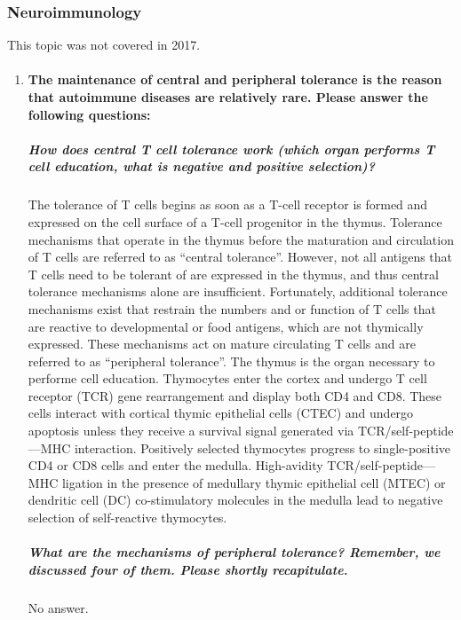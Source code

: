 \documentclass[12pt,article,oneside,a4paper]{memoir}
\begin{document}
\subsubsection{Neuroimmunology}
This topic was not covered in 2017.
\begin{enumerate}
\item \paragraph{The maintenance of central and peripheral tolerance is the
reason that autoimmune diseases are relatively rare. Please answer the following
questions:}

\subparagraph{How does central T cell tolerance work (which organ performs T
cell education, what is negative and positive selection)?}

The tolerance of T cells begins as soon as a T-cell receptor is formed and
expressed on the cell surface of a T-cell progenitor in the thymus. Tolerance
mechanisms that operate in the thymus before the maturation and circulation of
T cells are referred to as ``central tolerance''. However, not all antigens
that T cells need to be tolerant of are expressed in the thymus, and thus
central tolerance mechanisms alone are insufficient. Fortunately, additional
tolerance mechanisms exist that restrain the numbers and or function of T cells
that are reactive to developmental or food antigens, which are not thymically
expressed. These mechanisms act on mature circulating T cells and are referred
to as ``peripheral tolerance''.
The thymus is the organ necessary to performe cell education. Thymocytes enter
the cortex and undergo T cell receptor (TCR) gene rearrangement and display
both CD4 and CD8. These cells interact with cortical thymic epithelial cells
(CTEC) and undergo apoptosis unless they receive a survival signal generated
via TCR/self-peptide—MHC interaction. Positively selected thymocytes progress
to single-positive CD4 or CD8 cells and enter the medulla. High-avidity
TCR/self-peptide—MHC ligation in the presence of medullary thymic epithelial
cell (MTEC) or dendritic cell (DC) co-stimulatory molecules in the medulla lead
to negative selection of self-reactive thymocytes.

\subparagraph{What are the mechanisms of peripheral tolerance? Remember, we
discussed four of them. Please shortly recapitulate.}

No answer.

\end{enumerate}
\end{document}

